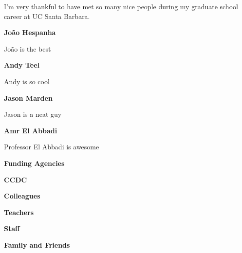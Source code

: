 { \setlength{\parindent}{0cm}

I'm very thankful to have met so many nice people during my graduate school career at UC Santa Barbara. 

{\bf Jo\~ao Hespanha}

Jo\~ao is the best

{\bf Andy Teel}

Andy is so cool

{\bf Jason Marden}

Jason is a neat guy

{\bf Amr El Abbadi}

Professor El Abbadi is awesome

{\bf Funding Agencies}

{\bf CCDC }

{\bf Colleagues}

{\bf Teachers}

{\bf Staff}

{\bf Family and Friends}

} %